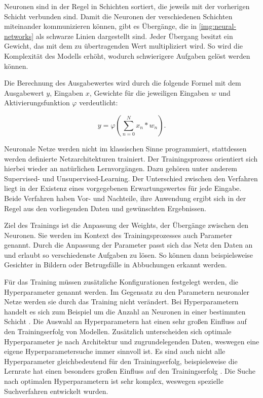 Neuronen sind in der Regel in Schichten sortiert, die jeweils mit der vorherigen Schicht verbunden sind.
Damit die Neuronen der verschiedenen Schichten miteinander kommunizieren können, gibt es Übergänge, die in \cref{img:neural-networks} als schwarze Linien dargestellt sind.
Jeder Übergang besitzt ein Gewicht, das mit dem zu übertragenden Wert multipliziert wird.
So wird die Komplexität des Modells erhöht, wodurch schwierigere Aufgaben gelöst werden können.
\newline

Die Berechnung des Ausgabewertes wird durch die folgende Formel mit dem Ausgabewert $y$, Eingaben $x$, Gewichte für die jeweiligen Eingaben $w$ und Aktivierungsfunktion $\varphi$ verdeutlicht:

\begin{equation}
	y = \varphi ( \sum_{n=0}^N x_n * w_n).
\end{equation}

Neuronale Netze werden nicht im klassischen Sinne programmiert, stattdessen werden definierte Netzarchitekturen trainiert.
Der Trainingsprozess orientiert sich hierbei wieder an natürlichen Lernvorgängen.
Dazu gehören unter anderem Supervised- und Unsupervised-Learning.
Der Unterschied zwischen den Verfahren liegt in der Existenz eines vorgegebenen Erwartungswertes für jede Eingabe.
Beide Verfahren haben Vor- und Nachteile, ihre Anwendung ergibt sich in der Regel aus den vorliegenden Daten und gewünschten Ergebnissen.

Ziel des Trainings ist die Anpassung der Weights, der Übergänge zwischen den Neuronen.
Sie werden im Kontext des Trainingsprozesses auch Parameter genannt.
Durch die Anpassung der Parameter passt sich das Netz den Daten an und erlaubt so verschiedenste Aufgaben zu lösen.
So können dann beispielsweise Gesichter in Bildern oder Betrugsfälle in Abbuchungen erkannt werden.
\newline

Für das Training müssen zusätzliche Konfigurationen festgelegt werden, die Hyperparameter genannt werden.
Im Gegensatz zu den Parametern neuronaler Netze werden sie durch das Training nicht verändert.
Bei Hyperparametern handelt es sich zum Beispiel um die Anzahl an Neuronen in einer bestimmten Schicht \cite{hyperparameters-gan-using-genetic-algorithm}.
Die Auswahl an Hyperparametern hat einen sehr großen Einfluss auf den Trainingserfolg von Modellen.
Zusätzlich unterscheiden sich optimale Hyperparameter je nach Architektur und zugrundelegenden Daten, weswegen eine eigene Hyperparametersuche immer sinnvoll ist. 
Es sind auch nicht alle Hyperparameter gleichbedeutend für den Trainingserfolg, beispielsweise die Lernrate hat einen besonders großen Einfluss auf den Trainingserfolg \cite{learning-rate-most-important}.
Die Suche nach optimalen Hyperparametern ist sehr komplex, weswegen spezielle Suchverfahren entwickelt wurden. 


